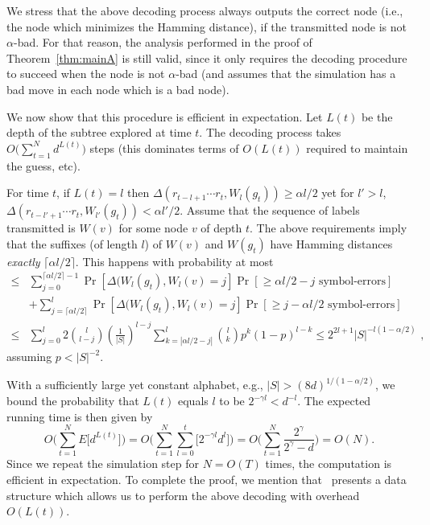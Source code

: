 \documentclass[ letterpaper, 11pt]{article}
\begin{document}
We stress that the above decoding process always outputs the correct
node (i.e., the node which minimizes the Hamming distance), if the transmitted
node is not $\alpha$-bad. For that reason, the analysis performed
in the proof of  Theorem~\ref{thm:mainA} is still valid, since it
only requires the decoding procedure to succeed when the node is not $\alpha$-bad
(and assumes that the simulation has a bad move
in each node which is a bad node).



We now show that this procedure is efficient in expectation.
Let $L(t)$ be the depth of the subtree explored at time $t$.
The decoding process takes $O\big(\sum_{t=1}^N d^{L(t)}\big)$  steps
(this dominates terms of  $O(L(t))$ required to maintain the guess, etc).

For time $t$, if $L(t)=l$ then $\Delta(r_{t-l+1}\cdots r_t, W_{l}(g_t)) \ge \alpha l/2$
yet for $l'>l$, $\Delta(r_{t-l'+1}\cdots r_t, W_{l'}(g_t)) < \alpha l'/2$. Assume that the
sequence of labels transmitted is $W(v)$ for some node $v$ of depth $t$.
The above requirements imply that the suffixes (of length $l$)
of $W(v)$ and $W(g_t)$ have Hamming distances \emph{exactly} $\lceil \alpha l/2\rceil$.
This happens with probability at most
\begin{align*}
\le &\sum_{j=0}^{\lceil\alpha l/2\rceil-1}\Pr[\Delta(W_{l}(g_t),W_{l}(v) = j]\Pr [\ge \alpha l/2-j \text{ symbol-errors}] \\
&+ \sum_{j=\lceil\alpha l/2\rceil}^l \Pr[\Delta(W_{l}(g_t),W_{l}(v) = j]\Pr [\ge j-\alpha l/2 \text{ symbol-errors}]
\\
\le & \sum_{j=0}^l 2{l \choose l-j} \left(\frac{1}{|S|}\right)^{l-j}
\sum_{k=|\alpha l/2-j|}^l{l \choose k} p^{k} (1-p)^{l-k}
\le  2^{2l+1} |S|^{-l(1-\alpha/2)}\text{ ,}
\end{align*}
assuming $p<|S|^{-2}$.

With a sufficiently large yet constant alphabet, e.g.,  $|S|>(8d)^{1/(1-\alpha/2)}$,
we bound
the probability that $L(t)$ equals $l$ to be $2^{-\gamma l}< d^{-l}$.
The expected running time is then given by
\[
O\bigg(  \sum_{t=1}^N E \Big[ d^{L(t)}\Big]\bigg) =
O\bigg(  \sum_{t=1}^N\sum_{l=0}^t \Big[ 2^{-\gamma l}d^{l}\Big]\bigg) =
O\bigg(  \sum_{t=1}^N \frac{2^\gamma}{2^{\gamma} -d} \bigg) = O(N)\text{.}
\]
Since we repeat the simulation step for  $N=O(T)$ times,
the computation is efficient in expectation.
To complete the proof, we mention that~\cite{schulman96} presents  a data structure
which allows us to perform the above decoding with overhead $O(L(t))$.
\end{document}
